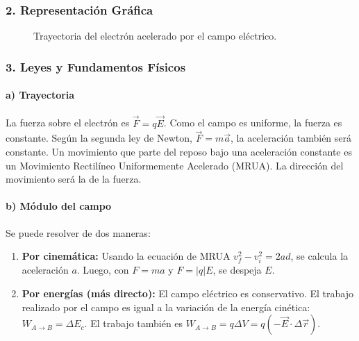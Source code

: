 \subsubsection*{2. Representación Gráfica}
\begin{figure}[H]
    \centering
    \caption{Trayectoria del electrón acelerado por el campo eléctrico.}
\end{figure}

\subsubsection*{3. Leyes y Fundamentos Físicos}
\paragraph{a) Trayectoria}
La fuerza sobre el electrón es $\vec{F} = q\vec{E}$. Como el campo es uniforme, la fuerza es constante. Según la segunda ley de Newton, $\vec{F}=m\vec{a}$, la aceleración también será constante. Un movimiento que parte del reposo bajo una aceleración constante es un Movimiento Rectilíneo Uniformemente Acelerado (MRUA). La dirección del movimiento será la de la fuerza.

\paragraph{b) Módulo del campo}
Se puede resolver de dos maneras:
\begin{enumerate}
    \item \textbf{Por cinemática:} Usando la ecuación de MRUA $v_f^2 - v_i^2 = 2ad$, se calcula la aceleración $a$. Luego, con $F=ma$ y $F=|q|E$, se despeja $E$.
    \item \textbf{Por energías (más directo):} El campo eléctrico es conservativo. El trabajo realizado por el campo es igual a la variación de la energía cinética: $W_{A \to B} = \Delta E_c$. El trabajo también es $W_{A \to B} = q \Delta V = q(-\vec{E} \cdot \Delta\vec{r})$.
\end{enumerate}

